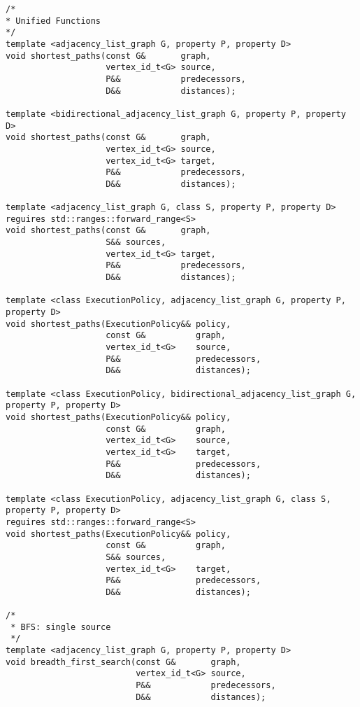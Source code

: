 \begin{lstlisting}
/*
* Unified Functions
*/
template <adjacency_list_graph G, property P, property D>
void shortest_paths(const G&       graph,
                    vertex_id_t<G> source,
                    P&&            predecessors,
                    D&&            distances);

template <bidirectional_adjacency_list_graph G, property P, property D>
void shortest_paths(const G&       graph,
                    vertex_id_t<G> source,
                    vertex_id_t<G> target,
                    P&&            predecessors,
                    D&&            distances);

template <adjacency_list_graph G, class S, property P, property D>
reguires std::ranges::forward_range<S>
void shortest_paths(const G&       graph,
                    S&& sources,
                    vertex_id_t<G> target,
                    P&&            predecessors,
                    D&&            distances);

template <class ExecutionPolicy, adjacency_list_graph G, property P, property D>
void shortest_paths(ExecutionPolicy&& policy,
                    const G&          graph,
                    vertex_id_t<G>    source,
                    P&&               predecessors,
                    D&&               distances);

template <class ExecutionPolicy, bidirectional_adjacency_list_graph G, property P, property D>
void shortest_paths(ExecutionPolicy&& policy,
                    const G&          graph,
                    vertex_id_t<G>    source,
                    vertex_id_t<G>    target,
                    P&&               predecessors,
                    D&&               distances);

template <class ExecutionPolicy, adjacency_list_graph G, class S, property P, property D>
reguires std::ranges::forward_range<S>
void shortest_paths(ExecutionPolicy&& policy,
                    const G&          graph,
                    S&& sources,
                    vertex_id_t<G>    target,
                    P&&               predecessors,
                    D&&               distances);

/*
 * BFS: single source
 */
template <adjacency_list_graph G, property P, property D>
void breadth_first_search(const G&       graph,
                          vertex_id_t<G> source,
                          P&&            predecessors,
                          D&&            distances);



\end{lstlisting}
